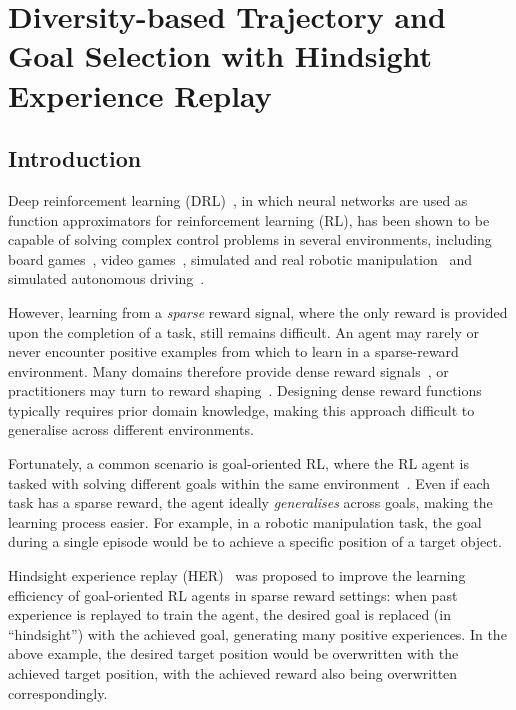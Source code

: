 \chapter{Diversity-based Trajectory and Goal Selection with Hindsight Experience Replay}
\section{Introduction}
Deep reinforcement learning (DRL)~\cite{arulkumaran2017deep}, in which neural networks are used as function approximators for reinforcement learning (RL), has been shown to be capable of solving complex control problems in several environments, including board games~\cite{schrittwieser2020mastering,silver2017mastering}, video games~\cite{berner2019dota,mnih2015human,vinyals2019grandmaster}, simulated and real robotic manipulation~\cite{andrychowicz2020learning,gu2017deep,levine2016end} and simulated autonomous driving~\cite{kiran2021deep}.

However, learning from a \textit{sparse} reward signal, where the only reward is provided upon the completion of a task, still remains difficult. An agent may rarely or never encounter positive examples from which to learn in a sparse-reward environment. Many domains therefore provide dense reward signals~\cite{brockman2016openai}, or practitioners may turn to reward shaping~\cite{ng1999theory}. Designing dense reward functions typically requires prior domain knowledge, making this approach difficult to generalise across different environments.

Fortunately, a common scenario is goal-oriented RL, where the RL agent is tasked with solving different goals within the same environment~\cite{kaelbling1993learning,schaul2015universal}. Even if each task has a sparse reward, the agent ideally \textit{generalises} across goals, making the learning process easier. For example, in a robotic manipulation task, the goal during a single episode would be to achieve a specific position of a target object.

Hindsight experience replay (HER)~\cite{NIPS2017_453fadbd} was proposed to improve the learning efficiency of goal-oriented RL agents in sparse reward settings: when past experience is replayed to train the agent, the desired goal is replaced (in ``hindsight'') with the achieved goal, generating many positive experiences. In the above example, the desired target position would be overwritten with the achieved target position, with the achieved reward also being overwritten correspondingly.

